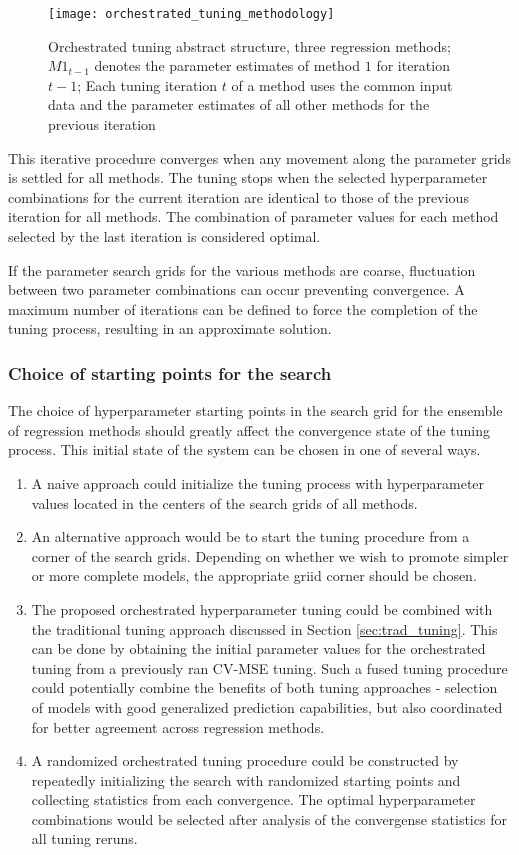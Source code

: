 \begin{figure}[bh]
	\centering
	\texttt{[image: orchestrated\_tuning\_methodology]}
	\caption{Orchestrated tuning abstract structure, three regression methods; $M1_{t-1}$ denotes the parameter estimates of method $1$ for iteration $t-1$; Each tuning iteration $t$ of a method uses the common input data and the parameter estimates of all other methods for the previous iteration}
	\label{fig:orc_tun_struct}
\end{figure}

This iterative procedure converges when any movement along the parameter grids is settled for all methods. The tuning stops when the selected hyperparameter combinations for the current iteration are identical to those of the previous iteration for all methods. The combination of parameter values for each method selected by the last iteration is considered optimal.

If the parameter search grids for the various methods are coarse, fluctuation between two parameter combinations can occur preventing convergence. A maximum number of iterations can be defined to force the completion of the tuning process, resulting in an approximate solution. 

\subsubsection{Choice of starting points for the search}
The choice of hyperparameter starting points in the search grid for the ensemble of regression methods should greatly affect the convergence state of the tuning process. This initial state of the system can be chosen in one of several ways.

\begin{enumerate}
\item A naive approach could initialize the tuning process with hyperparameter values located in the centers of the search grids of all methods.
\item An alternative approach would be to start the tuning procedure from a corner of the search grids. Depending on whether we wish to promote simpler or more complete models, the appropriate griid corner should be chosen.
\item The proposed orchestrated hyperparameter tuning could be combined with the traditional tuning approach discussed in Section \ref{sec:trad_tuning}. This can be done by obtaining the initial parameter values for the orchestrated tuning from a previously ran CV-MSE tuning. Such a fused tuning procedure could potentially combine the benefits of both tuning approaches - selection of models with good generalized prediction capabilities, but also coordinated for better agreement across regression methods.
\item A randomized orchestrated tuning procedure could be constructed by repeatedly initializing the search with randomized starting points and collecting statistics from each convergence. The optimal hyperparameter combinations would be selected after analysis of the convergense statistics for all tuning reruns.
\end{enumerate}

